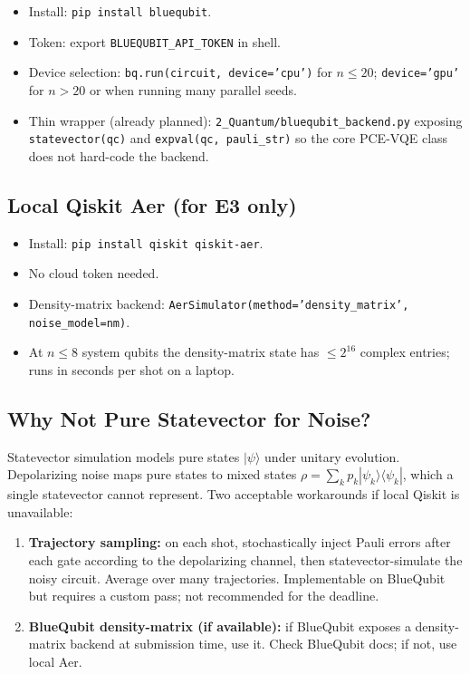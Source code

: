 \documentclass[11pt]{article}
\begin{document}
\begin{itemize}[leftmargin=*]
  \item Install: \texttt{pip install bluequbit}.
  \item Token: export \texttt{BLUEQUBIT\_API\_TOKEN} in shell.
  \item Device selection: \texttt{bq.run(circuit, device='cpu')} for
        $n \leq 20$; \texttt{device='gpu'} for $n > 20$ or when
        running many parallel seeds.
  \item Thin wrapper (already planned):
        \texttt{2\_Quantum/bluequbit\_backend.py} exposing
        \texttt{statevector(qc)} and \texttt{expval(qc, pauli\_str)}
        so the core PCE-VQE class does not hard-code the backend.
\end{itemize}

\subsection{Local Qiskit Aer (for E3 only)}

\begin{itemize}[leftmargin=*]
  \item Install: \texttt{pip install qiskit qiskit-aer}.
  \item No cloud token needed.
  \item Density-matrix backend:
        \texttt{AerSimulator(method='density\_matrix',
        noise\_model=nm)}.
  \item At $n \leq 8$ system qubits the density-matrix state has
        $\leq 2^{16}$ complex entries; runs in seconds per shot
        on a laptop.
\end{itemize}

\subsection{Why Not Pure Statevector for Noise?}

Statevector simulation models pure states $|\psi\rangle$ under
unitary evolution. Depolarizing noise maps pure states to mixed
states $\rho = \sum_k p_k |\psi_k\rangle\langle\psi_k|$, which a
single statevector cannot represent. Two acceptable workarounds if
local Qiskit is unavailable:
\begin{enumerate}[leftmargin=*]
  \item \textbf{Trajectory sampling:} on each shot, stochastically
        inject Pauli errors after each gate according to the
        depolarizing channel, then statevector-simulate the noisy
        circuit. Average over many trajectories. Implementable on
        BlueQubit but requires a custom pass; not recommended for
        the deadline.
  \item \textbf{BlueQubit density-matrix (if available):} if
        BlueQubit exposes a density-matrix backend at submission
        time, use it. Check BlueQubit docs; if not, use local
        Aer.
\end{enumerate}
\end{document}
